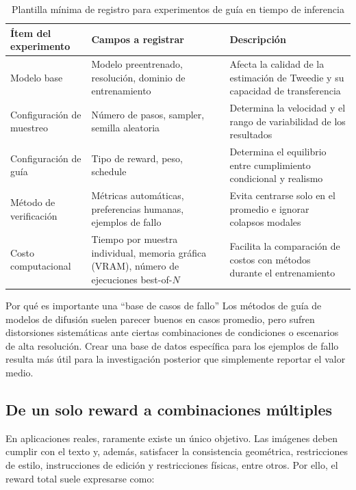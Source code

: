 \documentclass[a4paper]{article}
\begin{document}
\begin{table}[H]
\centering
\begin{tabular}{p{} p{} p{}}
\toprule
Ítem del experimento & Campos a registrar & Descripción \\
\midrule
Modelo base & Modelo preentrenado, resolución, dominio de entrenamiento & Afecta la calidad de la estimación de Tweedie y su capacidad de transferencia \\
Configuración de muestreo & Número de pasos, sampler, semilla aleatoria & Determina la velocidad y el rango de variabilidad de los resultados \\
Configuración de guía & Tipo de reward, peso, schedule & Determina el equilibrio entre cumplimiento condicional y realismo \\
Método de verificación & Métricas automáticas, preferencias humanas, ejemplos de fallo & Evita centrarse solo en el promedio e ignorar colapsos modales \\
Costo computacional & Tiempo por muestra individual, memoria gráfica (VRAM), número de ejecuciones best-of-$N$ & Facilita la comparación de costos con métodos durante el entrenamiento \\
\bottomrule
\end{tabular}
\caption{Plantilla mínima de registro para experimentos de guía en tiempo de inferencia}
\end{table}

\begin{knowledgebox}{Por qué es importante una ``base de casos de fallo''}
Los métodos de guía de modelos de difusión suelen parecer buenos en casos promedio, pero sufren distorsiones sistemáticas ante ciertas combinaciones de condiciones o escenarios de alta resolución. Crear una base de datos específica para los ejemplos de fallo resulta más útil para la investigación posterior que simplemente reportar el valor medio.
\end{knowledgebox}

\subsection{De un solo reward a combinaciones múltiples}

En aplicaciones reales, raramente existe un único objetivo. Las imágenes deben cumplir con el texto y, además, satisfacer la consistencia geométrica, restricciones de estilo, instrucciones de edición y restricciones físicas, entre otros. Por ello, el reward total suele expresarse como:
\end{document}
